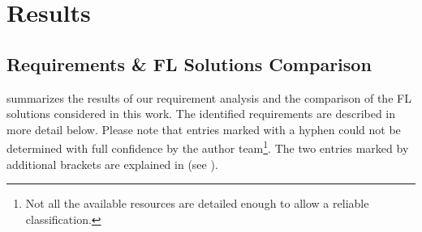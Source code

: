 \section{Results}
\label{sec:Results}

\subsection{Requirements \& FL Solutions Comparison}
\label{subsec:ResultsRequirements}

 summarizes the results of our requirement analysis and the comparison of the FL solutions considered in this work. The identified requirements are described in more detail below. Please note that entries marked with a hyphen could not be determined with full confidence by the author team\footnote{Not all the available resources are detailed enough to allow a reliable classification.}.
The two entries marked by additional brackets are explained in  (see \pageref{subsec:DiscussionRequirements}).



